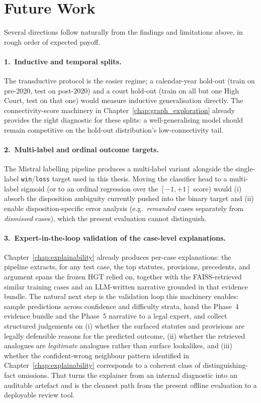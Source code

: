 \section{Future Work}

Several directions follow naturally from the findings and limitations
above, in rough order of expected payoff.

\paragraph{1.\ Inductive and temporal splits.} The transductive
protocol is the easier regime; a calendar-year hold-out (train on
pre-2020, test on post-2020) and a court hold-out (train on all but
one High Court, test on that one) would measure inductive
generalisation directly. The connectivity-score machinery in
Chapter~\ref{chap:graph_exploration} already provides the right
diagnostic for these splits: a well-generalising model should remain
competitive on the hold-out distribution's low-connectivity tail.

\paragraph{2.\ Multi-label and ordinal outcome targets.} The Mistral
labelling pipeline produces a multi-label variant alongside the
single-label \texttt{win}/\texttt{loss} target used in this thesis.
Moving the classifier head to a multi-label sigmoid (or to an ordinal
regression over the $[-1,+1]$ score) would (i) absorb the
disposition ambiguity currently pushed into the binary target and
(ii) enable disposition-specific error analysis (e.g.\ \emph{remanded}
cases separately from \emph{dismissed} cases), which the present
evaluation cannot distinguish.

\paragraph{3.\ Expert-in-the-loop validation of the case-level
explanations.} Chapter~\ref{chap:explainability} already produces
per-case explanations: the  pipeline extracts,
for any test case, the top statutes, provisions, precedents, and
argument spans the frozen HGT relied on, together with the
FAISS-retrieved similar training cases and an LLM-written narrative
grounded in that evidence bundle.  The natural next step is the
validation loop this machinery enables: sample predictions across
confidence and difficulty strata, hand the Phase~4 evidence bundle
and the Phase~5 narrative to a legal expert, and collect structured
judgements on (i) whether the surfaced statutes and provisions are
legally defensible reasons for the predicted outcome, (ii) whether
the retrieved analogues are \emph{legitimate} analogues rather than
surface lookalikes, and (iii) whether the confident-wrong neighbour
pattern identified in Chapter~\ref{chap:explainability} corresponds
to a coherent class of distinguishing-fact omissions.  That turns
the explainer from an internal diagnostic into an auditable
artefact and is the cleanest path from the present offline
evaluation to a deployable review tool.

